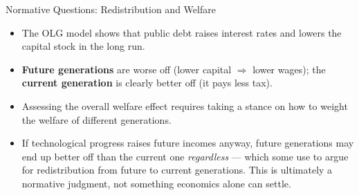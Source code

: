 \documentclass[11pt,aspectratio=169]{beamer}
\begin{document}
\begin{frame}{Normative Questions: Redistribution and Welfare}
  \small
  \begin{itemize}
    \item The OLG model shows that public debt raises interest rates and lowers the capital stock in the long run.
    \item \textbf{Future generations} are worse off (lower capital $\Rightarrow$ lower wages); the \textbf{current generation} is clearly better off (it pays less tax).
    \item Assessing the overall welfare effect requires taking a stance on how to weight the welfare of different generations.
    \item If technological progress raises future incomes anyway, future generations may end up better off than the current one \emph{regardless} --- which some use to argue for redistribution from future to current generations. This is ultimately a normative judgment, not something economics alone can settle.
  \end{itemize}
\end{frame}
\end{document}
